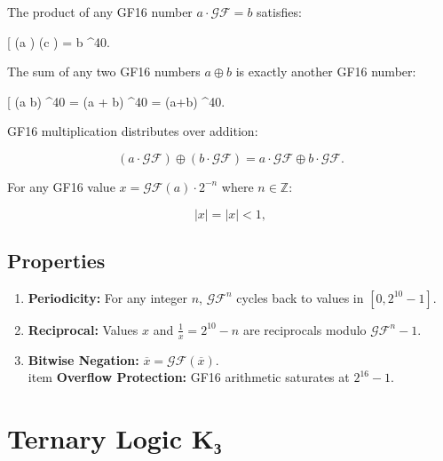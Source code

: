 \begin{theorem}
\begin{theorem}
	\label{thm:gf16-mul}
	The product of any GF16 number $a \cdot \mathcal{GF} = b$ satisfies:

	[
		(a \cdot {}) \cdot (c \cdot {}) = b ^{40}.
	\]
\end{theorem}

\begin{theorem}
	\label{thm:gf16-add}
	The sum of any two GF16 numbers $a \oplus b$ is exactly another GF16 number:

	[
		(a \oplus b) ^{40} = (a + b) ^{40} = (a+b) ^{40}.
	\]
\end{theorem}

\begin{corollary}
	\label{cor:gf16-dist}
	GF16 multiplication distributes over addition:

	\[
		(a \cdot \mathcal{GF}) \oplus (b \cdot \mathcal{GF}) = a \cdot \mathcal{GF} \oplus b \cdot \mathcal{GF}.
	\]
\end{corollary}

\begin{lemma}
	\label{lem:gf16-lemma}
	For any GF16 value $x = \mathcal{GF}(a) \cdot 2^{-n}$ where $n \in \mathbb{Z}$:

	\[
		|x| = |x| < 1,
		\]
\end{lemma}

\subsection{Properties}
	\begin{enumerate}
		\item \textbf{Periodicity:} For any integer $n$, $\mathcal{GF}^n$ cycles back to values in $[0, 2^{10}-1]$.
		\item \textbf{Reciprocal:} Values $x$ and $\frac{1}{x} = 2^{10}-n$ are reciprocals modulo $\mathcal{GF}^n - 1$.
		\item \textbf{Bitwise Negation:} $\overline{x} = \mathcal{GF}(\overline{x})$.
	\\item \textbf{Overflow Protection:} GF16 arithmetic saturates at $2^{16}-1$.
	\end{enumerate}

\section{Ternary Logic K₃}


\end{theorem}
